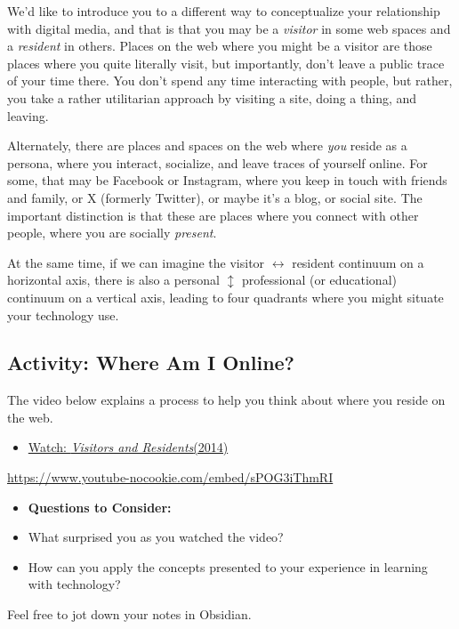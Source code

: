 \documentclass[
  letterpaper,
  DIV=11,
  numbers=noendperiod]{scrreprt}
\providecommand{\tightlist}{%
  \setlength{\itemsep}{0pt}\setlength{\parskip}{0pt}}\usepackage{longtable,booktabs,array}
\begin{document}
We'd like to introduce you to a different way to conceptualize your
relationship with digital media, and that is that you may be a
\emph{visitor} in some web spaces and a \emph{resident} in others.
Places on the web where you might be a visitor are those places where
you quite literally visit, but importantly, don't leave a public trace
of your time there. You don't spend any time interacting with people,
but rather, you take a rather utilitarian approach by visiting a site,
doing a thing, and leaving.

Alternately, there are places and spaces on the web where \emph{you}
reside as a persona, where you interact, socialize, and leave traces of
yourself online. For some, that may be Facebook or Instagram, where you
keep in touch with friends and family, or X (formerly Twitter), or maybe
it's a blog, or social site. The important distinction is that these are
places where you connect with other people, where you are socially
\emph{present}.

At the same time, if we can imagine the visitor \(\leftrightarrow\)
resident continuum on a horizontal axis, there is also a personal
\(\updownarrow\) professional (or educational) continuum on a vertical
axis, leading to four quadrants where you might situate your technology
use.

\subsection{Activity: Where Am I
Online?}\label{activity-where-am-i-online}

\begin{tcolorbox}[enhanced jigsaw, toprule=.15mm, colback=white, colframe=quarto-callout-note-color-frame, bottomtitle=1mm, leftrule=.75mm, coltitle=black, titlerule=0mm, rightrule=.15mm, colbacktitle=quarto-callout-note-color!10!white, left=2mm, title={Learning Activity}, opacitybacktitle=0.6, opacityback=0, breakable, toptitle=1mm, arc=.35mm, bottomrule=.15mm]

The video below explains a process to help you think about where you
reside on the web.

\begin{itemize}
\tightlist
\item
  \href{https://www.youtube.com/watch?v=sPOG3iThmRI}{Watch:
  \emph{Visitors and Residents}(2014)}
\end{itemize}

\url{https://www.youtube-nocookie.com/embed/sPOG3iThmRI}

\begin{itemize}
\tightlist
\item
  \textbf{Questions to Consider:}
\item
  What surprised you as you watched the video?
\item
  How can you apply the concepts presented to your experience in
  learning with technology?
\end{itemize}

Feel free to jot down your notes in Obsidian.

\end{tcolorbox}
\end{document}
